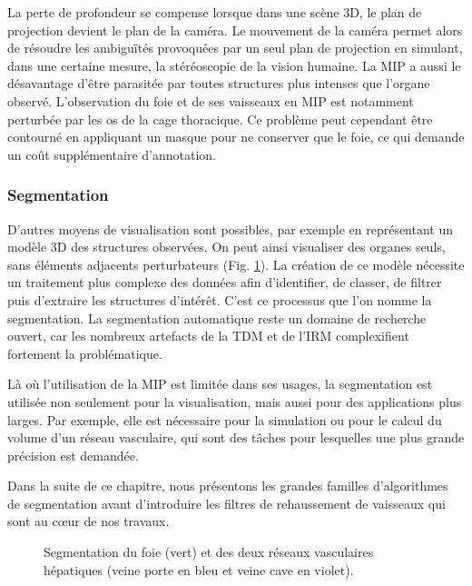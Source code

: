       La perte de profondeur se compense lorsque dans une scène 3D, le plan de projection devient le plan de la caméra. Le mouvement de la caméra permet alors de résoudre les ambiguïtés provoquées par un seul plan de projection en simulant, dans une certaine mesure, la stéréoscopie de la vision humaine.
      La MIP a aussi le désavantage d'être parasitée par toutes structures plus intenses que l'organe observé. L'observation du foie et de ses vaisseaux en MIP est notamment perturbée par les os de la cage thoracique. Ce problème peut cependant être contourné en appliquant un masque pour ne conserver que le foie, ce qui demande un coût supplémentaire d'annotation.

      \subsubsection{Segmentation}
      
      D'autres moyens de visualisation sont possibles, par exemple en représentant un modèle 3D des structures observées. On peut ainsi visualiser des organes seuls, sans éléments adjacents perturbateurs (Fig. \ref{fig:segmentation_3D}). La création de ce modèle nécessite un traitement plus complexe des données afin d'identifier, de classer, de filtrer puis d'extraire les structures d'intérêt. C'est ce processus que l'on nomme la segmentation. La segmentation automatique reste un domaine de recherche ouvert, car les nombreux artefacts de la TDM et de l'IRM complexifient fortement la problématique.
      
      Là où l'utilisation de la MIP est limitée dans ses usages, la segmentation est utilisée non seulement pour la visualisation, mais aussi pour des applications plus larges. Par exemple, elle est nécessaire pour la simulation ou pour le calcul du volume d'un réseau vasculaire, qui sont des tâches pour lesquelles une plus grande précision est demandée.
      
      Dans la suite de ce chapitre, nous présentons les grandes familles d'algorithmes de segmentation avant d'introduire les filtres de rehaussement de vaisseaux qui sont au cœur de nos travaux.

      \begin{figure}[h]
        \centering
        \caption{Segmentation du foie (vert) et des deux réseaux vasculaires hépatiques (veine porte en bleu et veine cave en violet).}
        \label{fig:segmentation_3D}
      \end{figure}
  
